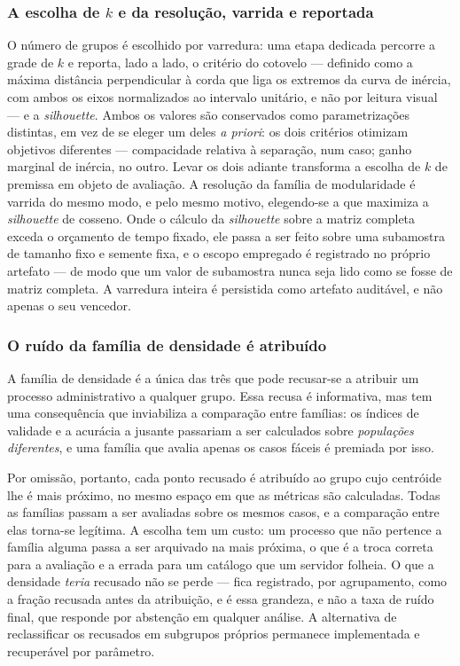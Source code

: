 \subsubsection{A escolha de $k$ e da resolução, varrida e reportada}\label{sec:selecaok}

O número de grupos é escolhido por varredura: uma etapa dedicada percorre a grade de $k$ e reporta,
lado a lado, o critério do cotovelo --- definido como a máxima distância perpendicular à corda que
liga os extremos da curva de inércia, com ambos os eixos normalizados ao intervalo unitário, e não
por leitura visual --- e a \emph{silhouette}. Ambos os valores são conservados como parametrizações
distintas, em vez de se eleger um deles \emph{a
priori}: os dois critérios otimizam objetivos diferentes --- compacidade relativa à separação, num
caso; ganho marginal de inércia, no outro.
Levar os dois adiante transforma a escolha de $k$ de premissa em objeto de avaliação. A resolução da
família de modularidade é varrida do mesmo modo, e pelo mesmo motivo, elegendo-se a que maximiza a
\emph{silhouette} de cosseno. Onde o cálculo da \emph{silhouette} sobre a matriz completa exceda o
orçamento de tempo fixado, ele passa a ser feito sobre uma subamostra de tamanho fixo e semente
fixa, e o escopo empregado é registrado no próprio artefato --- de modo que um valor de subamostra
nunca seja lido como se fosse de matriz completa. A varredura inteira é persistida como artefato
auditável, e não apenas o seu vencedor.

\subsubsection{O ruído da família de densidade é atribuído}\label{sec:ruido}

A família de densidade é a única das três que pode recusar-se a atribuir um processo administrativo
a qualquer grupo. Essa recusa é informativa, mas tem uma consequência que inviabiliza a comparação
entre famílias: os índices de validade e a acurácia a jusante passariam a ser calculados sobre
\emph{populações diferentes}, e uma família que avalia apenas os casos fáceis é premiada por isso.

Por omissão, portanto, cada ponto recusado é atribuído ao grupo cujo centróide lhe é mais próximo,
no mesmo espaço em que as métricas são calculadas. Todas as famílias passam a ser avaliadas sobre os
mesmos casos, e a comparação entre elas torna-se legítima. A escolha tem um custo: um processo que
não pertence a família alguma passa a ser arquivado na mais
próxima, o que é a troca correta para a avaliação e a errada para um catálogo que um servidor
folheia. O que a densidade \emph{teria} recusado não se perde --- fica registrado, por agrupamento,
como a fração recusada antes da atribuição, e é essa grandeza, e não a taxa de ruído final, que
responde por abstenção em qualquer análise. A alternativa de reclassificar os recusados em
subgrupos próprios permanece implementada e recuperável por parâmetro.

